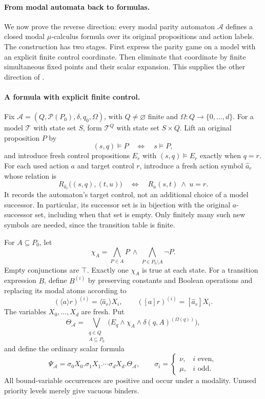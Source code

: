 \paragraph{From modal automata back to formulas.}
\label{sec:p09-mu-automaton-to-formula}
We now prove the reverse direction: every modal
parity automaton \(\mathcal A\) defines a closed
modal \(\mu\)-calculus formula over its original
propositions and action labels. The construction
has two stages. First express the parity game
on a model with an explicit finite control
coordinate. Then eliminate that coordinate by
finite simultaneous fixed points and their
scalar expansion. This supplies the other
direction of \cite[\S5.3, thm.~5.2]{BradfieldStirling2007}.

\paragraph{A formula with explicit finite control.}
Fix
\(\mathcal A=(Q,\mathcal P(P_0),\delta,q_0,\Omega)\),
with \(Q\ne\varnothing\) finite and
\(\Omega:Q\to\{0,\ldots,d\}\).
For a model \(\mathcal T\) with state set \(S\),
form \(\mathcal T^Q\) with state set \(S\times Q\).
Lift an original proposition \(P\) by
\[
 (s,q)\models P\quad\Longleftrightarrow\quad
 s\models P,
\]
and introduce fresh control propositions \(E_r\)
with \((s,q)\models E_r\) exactly when \(q=r\).
For each used action \(a\) and target control \(r\),
introduce a fresh action symbol \(\widehat a_r\)
whose relation is
\[
 R_{\widehat a_r}\bigl((s,q),(t,u)\bigr)
 \quad\Longleftrightarrow\quad
 R_a(s,t)\ \land\ u=r.
\]
It records the automaton's target control,
not an additional choice of a model successor.
In particular, its successor set is in
bijection with the original \(a\)-successor
set, including when that set is empty.
Only finitely many such new symbols are
needed, since the transition table is finite.

For \(A\subseteq P_0\), let
\[
 \chi_A=
   \bigwedge_{P\in A}P\ \land\
   \bigwedge_{P\in P_0\setminus A}\neg P.
\]
Empty conjunctions are \(\top\).
Exactly one \(\chi_A\) is true at each state.
For a transition expression \(B\), define
\(B^{(i)}\) by preserving constants and
Boolean operations and replacing its
modal atoms according to
\[
 (\langle a\rangle r)^{(i)}
       =\langle\widehat a_r\rangle X_i,
 \qquad
 ([a]r)^{(i)}=[\widehat a_r]X_i.
\]
The variables \(X_0,\ldots,X_d\) are fresh.
Put
\[
 \Theta_{\mathcal A}=
 \bigvee_{\substack{q\in Q\\A\subseteq P_0}}
       \bigl(E_q\land\chi_A\land
                       \delta(q,A)^{(\Omega(q))}\bigr),
\]
and define the ordinary scalar formula
\[
 \Psi_{\mathcal A}
   =\sigma_0X_0.\sigma_1X_1.\cdots
                    \sigma_dX_d.\Theta_{\mathcal A},
 \qquad
 \sigma_i=
 \begin{cases}
  \nu,&i\text{ even},\\
  \mu,&i\text{ odd}.
 \end{cases}
\]
All bound-variable occurrences are positive
and occur under a modality. Unused priority
levels merely give vacuous binders.

